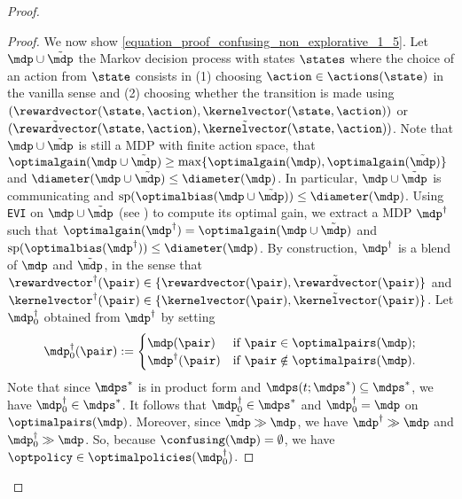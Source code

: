 \documentclass[preprint,cleveref,12pt]{colt2025}
\DeclarePairedDelimiter{\braces}{\{}{\}}	%
\DeclarePairedDelimiter{\parens}{(}{)}	%
\newcommand{\vecspan}[1]{\mathrm{sp}\parens{#1}}
\def\model{\mdp}
\def\models{\mdps}
\def\kernel{\kernelvector}
\def\reward{\rewardvector}
\def\optpolicies{\optimalpolicies}
\def\optpairs{\optimalpairs}
\def\optgain{\optimalgain} %
\def\optbias{\optimalbias} %
\begin{document}
\begin{proof}
\begin{proof}
            We now show \eqref{equation_proof_confusing_non_explorative_1_5}.
            Let $\model \cup \tilde{\model}$ the Markov decision process with states $\states$ where the choice of an action from $\state$ consists in (1) choosing $\action \in \actions(\state)$ in the vanilla sense and (2) choosing whether the transition is made using $(\reward(\state, \action), \kernel(\state, \action))$ or $(\tilde{\reward}(\state, \action), \tilde{\kernel}(\state, \action))$. 
            Note that $\model \cup \tilde{\model}$ is still a MDP with finite action space, that $\optgain(\model \cup \tilde{\model}) \ge \max\braces{\optgain(\model), \optgain(\tilde{\model})}$ and $\diameter(\model \cup \tilde{\model}) \le \diameter(\model)$. 
            In particular, $\model \cup \tilde{\model}$ is communicating and $\vecspan{\optbias(\model \cup \tilde{\model})} \le \diameter(\model)$. 
            Using \texttt{EVI} on $\model \cup \tilde{\model}$ (see ) to compute its optimal gain, we extract a MDP $\model^\dagger$ such that $\optgain(\model^\dagger) = \optgain(\model \cup \tilde{\model})$ and $\vecspan{\optbias(\model^\dagger)} \le \diameter(\model)$. 
            By construction, $\model^\dagger$ is a blend of $\model$ and $\tilde{\model}$, in the sense that $\reward^\dagger(\pair) \in \braces{\reward(\pair), \tilde{\reward}(\pair)}$ and $\kernel^\dagger(\pair) \in \braces{\kernel(\pair), \tilde{\kernel}(\pair)}$. 
            Let $\model^\dagger_0$ obtained from $\model^\dagger$ by setting 
            \begin{equation*}
                \model^\dagger_0 (\pair)
                :=
                \begin{cases}
                    \model(\pair) & \text{if~} \pair \in \optpairs(\model);
                    \\
                    \model^\dagger (\pair) & \text{if~} \pair \notin \optpairs(\model).
                \end{cases}
            \end{equation*}
            Note that since $\models^*$ is in product form and $\models(t; \models^*) \subseteq \models^*$, we have $\model_0^\dagger \in \models^*$. 
            It follows that $\model^\dagger_0 \in \models^*$ and $\model^\dagger_0 = \model$ on $\optpairs(\model)$.
            Moreover, since $\tilde{\model} \gg \model$, we have $\model^\dagger \gg \model$ and $\model^\dagger_0 \gg \model$.
            So, because $\confusing(\model) = \emptyset$, we have $\optpolicy \in \optpolicies(\model_0^\dagger)$. 

\end{proof}
\end{proof}
\end{document}
